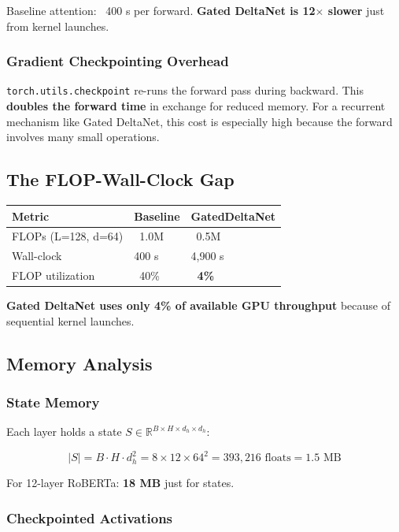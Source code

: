 Baseline attention: ~400  s per forward. \textbf{Gated DeltaNet is 12$\times$ slower} 
just from kernel launches.

\subsubsection{Gradient Checkpointing Overhead}

\texttt{torch.utils.checkpoint} re-runs the forward pass during backward. This 
\textbf{doubles the forward time} in exchange for reduced memory. For a 
recurrent mechanism like Gated DeltaNet, this cost is especially high 
because the forward involves many small operations.

\subsection{The FLOP-Wall-Clock Gap}

\begin{table}[H]
\centering
\small
\begin{tabular}{lll}
\toprule
\textbf{Metric} & \textbf{Baseline} & \textbf{GatedDeltaNet} \\
\midrule
FLOPs (L=128, d=64) & ~1.0M & ~0.5M \\
Wall-clock & 400  s & 4,900  s \\
FLOP utilization & ~40\% & \textbf{~4\%} \\
\bottomrule
\end{tabular}
\end{table}

\textbf{Gated DeltaNet uses only 4\% of available GPU throughput} because of 
sequential kernel launches.

\subsection{Memory Analysis}

\subsubsection{State Memory}

Each layer holds a state $S \in \mathbb{R}^{B \times H \times d_h \times d_h}$:

\[
|S| = B \cdot H \cdot d_h^2 = 8 \times 12 \times 64^2 = 393,216 \text{ floats} 
= 1.5 \text{ MB}
\]

For 12-layer RoBERTa: \textbf{18 MB} just for states.

\subsubsection{Checkpointed Activations}

